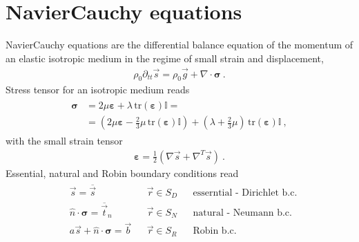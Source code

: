 \documentclass[letterpaper,10pt,english]{jupyterBook}
\begin{document}
\chapter{Navier\sphinxhyphen{}Cauchy equations}
\label{\detokenize{ch/pde/nc:navier-cauchy-equations}}\label{\detokenize{ch/pde/nc:pde-nc}}\label{\detokenize{ch/pde/nc::doc}}
\sphinxAtStartPar
Navier\sphinxhyphen{}Cauchy equations are the differential balance equation of the momentum of an elastic isotropic medium in the regime of small strain and displacement,
\begin{equation*}
\begin{split}\rho_0 \partial_{tt} \vec{s} = \rho_0 \vec{g} + \nabla \cdot \symbf{\sigma} \ . \end{split}
\end{equation*}
\sphinxAtStartPar
Stress tensor for an isotropic medium reads
\begin{equation*}
\begin{split}\begin{aligned}
  \symbf{\sigma}
   & = 2 \mu \symbf{\varepsilon} + \lambda \, \text{tr} \left( \symbf{\varepsilon} \right) \mathbb{I} = \\
   & = \left( 2 \mu \symbf{\varepsilon} - \frac{2}{3} \mu \, \text{tr}(\symbf{\varepsilon}) \mathbb{I} \right) + \left( \lambda + \frac{2}{3} \mu \right) \, \text{tr} \left( \symbf{\varepsilon} \right) \mathbb{I} \ ,
\end{aligned}\end{split}
\end{equation*}
\sphinxAtStartPar
with the small strain tensor
\begin{equation*}
\begin{split}\symbf{\varepsilon} = \frac{1}{2} \left( \nabla \vec{s} + \nabla^T \vec{s} \right) \ .\end{split}
\end{equation*}
\sphinxAtStartPar
Essential, natural and Robin boundary conditions read
\begin{equation*}
\begin{split}\begin{aligned}
  & \vec{s} = \overline{\vec{s}} && \vec{r} \in S_D && \text{esserntial - Dirichlet b.c.}  \\
  & \hat{n} \cdot \symbf{\sigma} = \overline{\vec{t}}_n && \vec{r} \in S_N && \text{natural - Neumann b.c.}  \\
  & a \vec{s} + \hat{n} \cdot \symbf{\sigma} = \vec{b} && \vec{r} \in S_R && \text{Robin b.c.} \\
\end{aligned}\end{split}
\end{equation*}
\end{document}
